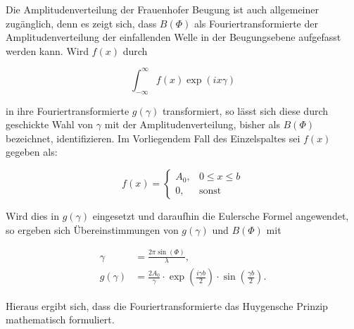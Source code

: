 Die Amplitudenverteilung der Frauenhofer Beugung ist auch allgemeiner zugänglich, denn es zeigt sich, 
dass $B(\Phi)$ als Fouriertransformierte der Amplitudenverteilung der einfallenden Welle in der 
Beugungsebene aufgefasst werden kann. Wird $f(x)$ durch 

\begin{equation*}
\int_{-\infty}^{\infty} f(x) \exp{\left(ix\gamma\right)}
\end{equation*}

in ihre Fouriertransformierte $g(\gamma)$ transformiert, so lässt sich diese durch geschickte Wahl von 
$\gamma$ mit der Amplitudenverteilung, bisher als $B(\Phi)$ bezeichnet, identifizieren. Im Vorliegendem 
Fall des Einzelspaltes sei $f(x)$ gegeben als:

\begin{equation*}
f(x) = 
\begin{cases}
A_0, & 0 \le x \le b\\
0  , & \text{sonst} 
\end{cases}
\end{equation*}

Wird dies in $g(\gamma)$ eingesetzt und daraufhin die Eulersche Formel angewendet, so ergeben sich Übereinstimmungen
von $g(\gamma)$ und $B(\Phi)$ mit 

\begin{align*}
\gamma &= \frac{2\pi\sin{(\Phi)}}{\lambda},\\
g(\gamma) &= \frac{2 A_0}{\gamma} \cdot \exp{\left(\frac{i\gamma b}{2}\right)}\cdot \sin{\left(\frac{\gamma b}{2}\right)}.
\end{align*}

Hieraus ergibt sich, dass die Fouriertransformierte das Huygensche Prinzip mathematisch formuliert. 

